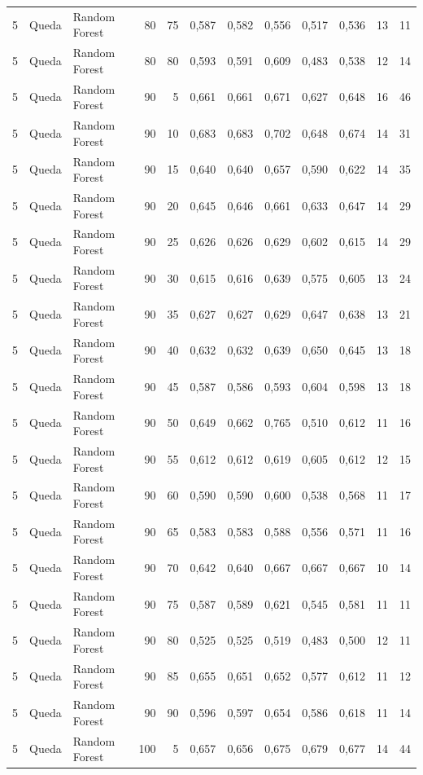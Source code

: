 \begin{longtable}{@{}rllrrrrrrrrr@{}}
5 & Queda & Random Forest & 80 & 75 & 0,587 & 0,582 & 0,556 & 0,517 & 0,536 & 13 & 11 \\
5 & Queda & Random Forest & 80 & 80 & 0,593 & 0,591 & 0,609 & 0,483 & 0,538 & 12 & 14 \\
5 & Queda & Random Forest & 90 & 5 & 0,661 & 0,661 & 0,671 & 0,627 & 0,648 & 16 & 46 \\
5 & Queda & Random Forest & 90 & 10 & 0,683 & 0,683 & 0,702 & 0,648 & 0,674 & 14 & 31 \\
5 & Queda & Random Forest & 90 & 15 & 0,640 & 0,640 & 0,657 & 0,590 & 0,622 & 14 & 35 \\
5 & Queda & Random Forest & 90 & 20 & 0,645 & 0,646 & 0,661 & 0,633 & 0,647 & 14 & 29 \\
5 & Queda & Random Forest & 90 & 25 & 0,626 & 0,626 & 0,629 & 0,602 & 0,615 & 14 & 29 \\
5 & Queda & Random Forest & 90 & 30 & 0,615 & 0,616 & 0,639 & 0,575 & 0,605 & 13 & 24 \\
5 & Queda & Random Forest & 90 & 35 & 0,627 & 0,627 & 0,629 & 0,647 & 0,638 & 13 & 21 \\
5 & Queda & Random Forest & 90 & 40 & 0,632 & 0,632 & 0,639 & 0,650 & 0,645 & 13 & 18 \\
5 & Queda & Random Forest & 90 & 45 & 0,587 & 0,586 & 0,593 & 0,604 & 0,598 & 13 & 18 \\
5 & Queda & Random Forest & 90 & 50 & 0,649 & 0,662 & 0,765 & 0,510 & 0,612 & 11 & 16 \\
5 & Queda & Random Forest & 90 & 55 & 0,612 & 0,612 & 0,619 & 0,605 & 0,612 & 12 & 15 \\
5 & Queda & Random Forest & 90 & 60 & 0,590 & 0,590 & 0,600 & 0,538 & 0,568 & 11 & 17 \\
5 & Queda & Random Forest & 90 & 65 & 0,583 & 0,583 & 0,588 & 0,556 & 0,571 & 11 & 16 \\
5 & Queda & Random Forest & 90 & 70 & 0,642 & 0,640 & 0,667 & 0,667 & 0,667 & 10 & 14 \\
5 & Queda & Random Forest & 90 & 75 & 0,587 & 0,589 & 0,621 & 0,545 & 0,581 & 11 & 11 \\
5 & Queda & Random Forest & 90 & 80 & 0,525 & 0,525 & 0,519 & 0,483 & 0,500 & 12 & 11 \\
5 & Queda & Random Forest & 90 & 85 & 0,655 & 0,651 & 0,652 & 0,577 & 0,612 & 11 & 12 \\
5 & Queda & Random Forest & 90 & 90 & 0,596 & 0,597 & 0,654 & 0,586 & 0,618 & 11 & 14 \\
5 & Queda & Random Forest & 100 & 5 & 0,657 & 0,656 & 0,675 & 0,679 & 0,677 & 14 & 44 \\

\end{longtable}
